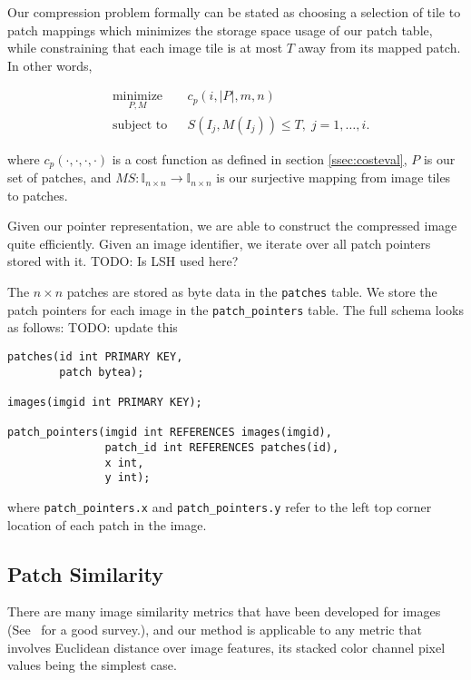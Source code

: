 Our compression problem formally can be stated as choosing a selection of tile to patch mappings which minimizes the storage space usage of our patch table, while constraining that each image tile is at most $T$ away from its mapped patch.  In other words,

\begin{equation*}
\begin{aligned}
& \underset{P, M}{\text{minimize}}
& & c_p(i, |P|, m, n) \\
& \text{subject to}
& & S(I_j, M(I_j)) \leq T, \; j = 1, \ldots, i.
\end{aligned}
\end{equation*}

where $c_p(\cdot, \cdot, \cdot, \cdot)$ is a cost function as defined in section \ref{ssec:costeval}, $P$ is our set of patches, and $M S \colon \mathds{I}_{n \times n}  \to \mathds{I}_{n \times n}$ is our surjective mapping from image tiles to patches.

Given our pointer representation, we are able to construct the compressed image quite efficiently.  Given an image identifier, we iterate over all patch pointers stored with it.  TODO: Is LSH used here?


The $n \times n$ patches are stored as byte data in the \texttt{patches} table.
We store the patch pointers for
each image in the \texttt{patch\_pointers} table. The full schema looks as follows: TODO: update this
\begin{verbatim}
patches(id int PRIMARY KEY,
        patch bytea);

images(imgid int PRIMARY KEY);

patch_pointers(imgid int REFERENCES images(imgid),
               patch_id int REFERENCES patches(id),
               x int,
               y int);
\end{verbatim}
where \texttt{patch\_pointers.x} and \texttt{patch\_pointers.y}
refer to the left top corner location of each patch in the image.




\subsection{Patch Similarity}\label{ssec:sim}
There are many image similarity metrics that have been developed for
images (See~\cite{yasmin2013use} for a good survey.), and
our method is applicable to any metric that involves Euclidean
distance over image features, its stacked color channel pixel values
being the simplest case.

